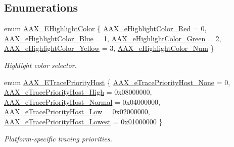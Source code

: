 \subsection*{Enumerations}
\begin{DoxyCompactItemize}
\item 
enum \mbox{\hyperlink{a00491_a143056a07989a48e5db3a101f1b12567}{A\+A\+X\+\_\+\+E\+Highlight\+Color}} \{ \newline
\mbox{\hyperlink{a00491_a143056a07989a48e5db3a101f1b12567acaa6b8c11b11324277235790607b3656}{A\+A\+X\+\_\+e\+Highlight\+Color\+\_\+\+Red}} = 0, 
\mbox{\hyperlink{a00491_a143056a07989a48e5db3a101f1b12567a91e0f080a5116cb8d9e1a10e5ba2b4a4}{A\+A\+X\+\_\+e\+Highlight\+Color\+\_\+\+Blue}} = 1, 
\mbox{\hyperlink{a00491_a143056a07989a48e5db3a101f1b12567a847fa775f6d9e87fc3c497500ce52fa7}{A\+A\+X\+\_\+e\+Highlight\+Color\+\_\+\+Green}} = 2, 
\mbox{\hyperlink{a00491_a143056a07989a48e5db3a101f1b12567a109077f199737720a75123eec232992f}{A\+A\+X\+\_\+e\+Highlight\+Color\+\_\+\+Yellow}} = 3, 
\newline
\mbox{\hyperlink{a00491_a143056a07989a48e5db3a101f1b12567a59c6a77d15d5837e437de423ca8d3fd4}{A\+A\+X\+\_\+e\+Highlight\+Color\+\_\+\+Num}}
 \}
\begin{DoxyCompactList}\small\item\em Highlight color selector. \end{DoxyCompactList}\item 
enum \mbox{\hyperlink{a00491_a2dd667e4dea5781f38832fd9f1725f1b}{A\+A\+X\+\_\+\+E\+Trace\+Priority\+Host}} \{ \newline
\mbox{\hyperlink{a00491_a2dd667e4dea5781f38832fd9f1725f1ba906b1198b124fa17cd5821cbb140a63f}{A\+A\+X\+\_\+e\+Trace\+Priority\+Host\+\_\+\+None}} = 0, 
\mbox{\hyperlink{a00491_a2dd667e4dea5781f38832fd9f1725f1baac76cc64a1379931edbc2bdc0f8aad66}{A\+A\+X\+\_\+e\+Trace\+Priority\+Host\+\_\+\+High}} = 0x08000000, 
\mbox{\hyperlink{a00491_a2dd667e4dea5781f38832fd9f1725f1ba327226d6962ad7f297506697c2001ce0}{A\+A\+X\+\_\+e\+Trace\+Priority\+Host\+\_\+\+Normal}} = 0x04000000, 
\mbox{\hyperlink{a00491_a2dd667e4dea5781f38832fd9f1725f1ba78edfc70bf7ba33fc5277e4146498c17}{A\+A\+X\+\_\+e\+Trace\+Priority\+Host\+\_\+\+Low}} = 0x02000000, 
\newline
\mbox{\hyperlink{a00491_a2dd667e4dea5781f38832fd9f1725f1baf101af483c232de54b31eba274a07c4c}{A\+A\+X\+\_\+e\+Trace\+Priority\+Host\+\_\+\+Lowest}} = 0x01000000
 \}
\begin{DoxyCompactList}\small\item\em Platform-\/specific tracing priorities. \end{DoxyCompactList}\item 

\end{DoxyCompactItemize}
